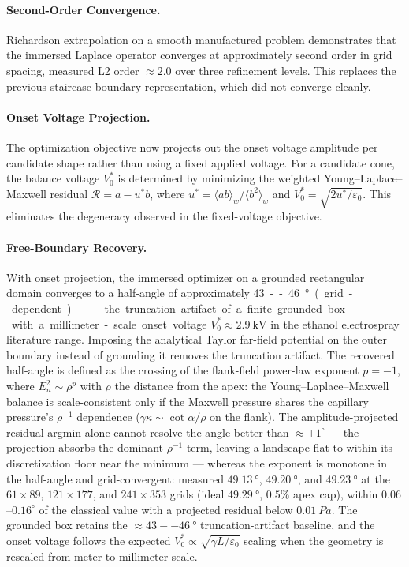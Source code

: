 \paragraph{Second-Order Convergence.} Richardson extrapolation on a smooth manufactured problem demonstrates that the immersed Laplace operator converges at approximately second order in grid spacing, measured L2 order $\approx 2.0$ over three refinement levels. This replaces the previous staircase boundary representation, which did not converge cleanly.

\paragraph{Onset Voltage Projection.} The optimization objective now projects out the onset voltage amplitude per candidate shape rather than using a fixed applied voltage. For a candidate cone, the balance voltage $V_0^*$ is determined by minimizing the weighted Young--Laplace--Maxwell residual $\mathcal{R} = a - u^* b$, where $u^* = \langle ab \rangle_w / \langle b^2 \rangle_w$ and $V_0^* = \sqrt{2u^*/\varepsilon_0}$. This eliminates the degeneracy observed in the fixed-voltage objective.

\paragraph{Free-Boundary Recovery.} With onset projection, the immersed optimizer on a grounded rectangular domain converges to a half-angle of approximately \SI{43}--\SI{46}{\degree} (grid-dependent) --- the truncation artifact of a finite grounded box --- with a millimeter-scale onset voltage $V_0^* \approx \SI{2.9}{\kV}$ in the ethanol electrospray literature range. Imposing the analytical Taylor far-field potential on the outer boundary instead of grounding it removes the truncation artifact. The recovered half-angle is defined as the crossing of the flank-field power-law exponent $p = -1$, where $E_n^2 \sim \rho^p$ with $\rho$ the distance from the apex: the Young--Laplace--Maxwell balance is scale-consistent only if the Maxwell pressure shares the capillary pressure's $\rho^{-1}$ dependence ($\gamma\kappa \sim \cot\alpha/\rho$ on the flank). The amplitude-projected residual argmin alone cannot resolve the angle better than $\approx\pm1^{\circ}$ --- the projection absorbs the dominant $\rho^{-1}$ term, leaving a landscape flat to within its discretization floor near the minimum --- whereas the exponent is monotone in the half-angle and grid-convergent: measured $\SI{49.13}{\degree}$, $\SI{49.20}{\degree}$, and $\SI{49.23}{\degree}$ at the $61\times89$, $121\times177$, and $241\times353$ grids (ideal $\SI{49.29}{\degree}$, $0.5\%$ apex cap), within $0.06$--$0.16^{\circ}$ of the classical value with a projected residual below $\SI{0.01}{Pa}$. The grounded box retains the $\approx\SI{43}--\SI{46}{\degree}$ truncation-artifact baseline, and the onset voltage follows the expected $V_0^* \propto \sqrt{\gamma L / \varepsilon_0}$ scaling when the geometry is rescaled from meter to millimeter scale.

